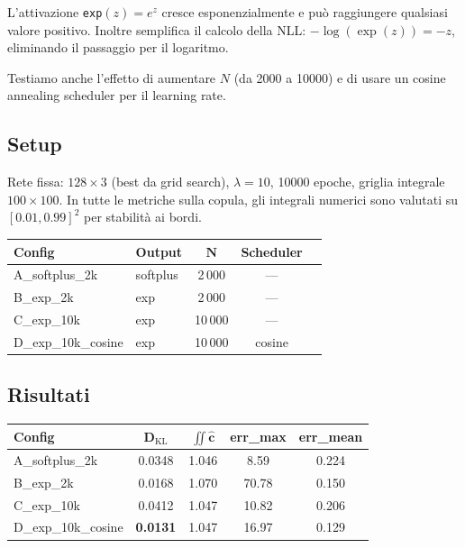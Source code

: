 \documentclass[11pt, a4paper]{article}
\begin{document}
L'attivazione \texttt{exp}$(z) = e^z$ cresce esponenzialmente e può raggiungere qualsiasi valore positivo. Inoltre semplifica il calcolo della NLL: $-\log(\exp(z)) = -z$, eliminando il passaggio per il logaritmo.

Testiamo anche l'effetto di aumentare $N$ (da 2000 a 10000) e di usare un cosine annealing scheduler per il learning rate.

\subsection{Setup}

Rete fissa: $128 \times 3$ (best da grid search), $\lambda = 10$, 10000 epoche, griglia integrale $100 \times 100$.
In tutte le metriche sulla copula, gli integrali numerici sono valutati su $[0.01,0.99]^2$ per stabilità ai bordi.

\begin{center}
\begin{tabular}{llccc}
\toprule
\textbf{Config} & \textbf{Output} & $\boldsymbol{N}$ & \textbf{Scheduler} \\
\midrule
A\_softplus\_2k    & softplus & 2\,000  & --- \\
B\_exp\_2k         & exp      & 2\,000  & --- \\
C\_exp\_10k        & exp      & 10\,000 & --- \\
D\_exp\_10k\_cosine & exp      & 10\,000 & cosine \\
\bottomrule
\end{tabular}
\end{center}

\subsection{Risultati}

\begin{center}
\begin{tabular}{lcccc}
\toprule
\textbf{Config} & $\boldsymbol{D_\mathrm{KL}}$ & $\boldsymbol{\iint \hat{c}}$ & \textbf{err\_max} & \textbf{err\_mean} \\
\midrule
A\_softplus\_2k      & 0.0348 & 1.046 & 8.59  & 0.224 \\
B\_exp\_2k           & 0.0168 & 1.070 & 70.78 & 0.150 \\
C\_exp\_10k          & 0.0412 & 1.047 & 10.82 & 0.206 \\
D\_exp\_10k\_cosine  & \textbf{0.0131} & 1.047 & 16.97 & 0.129 \\
\bottomrule
\end{tabular}
\end{center}
\end{document}
